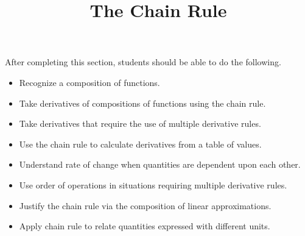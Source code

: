 \documentclass{ximera}
\title{The Chain Rule}
\begin{document}
\begin{abstract}
\end{abstract}

\maketitle

\begin{sectionOutcomes}

After completing this section, students should be able to do the following.

\begin{itemize}
	\item Recognize a composition of functions.
	\item Take derivatives of compositions of functions using the chain rule.
	\item Take derivatives that require the use of multiple derivative rules.
	\item Use the chain rule to calculate derivatives from a table of values.
	\item Understand rate of change when quantities are dependent upon each other.
	\item Use order of operations in situations requiring multiple derivative rules.
        \item Justify the chain rule via the composition of linear approximations.
        \item Apply chain rule to relate quantities expressed with different units.
\end{itemize}

\end{sectionOutcomes}
\end{document}
